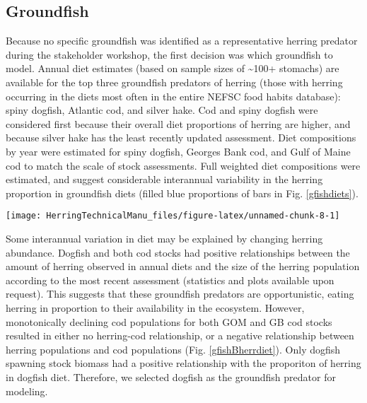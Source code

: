 \documentclass[]{article}
\let\origfigure\figure
\let\endorigfigure\endfigure
\renewenvironment{figure}[1][2] {
    \expandafter\origfigure\expandafter[H]
} {
    \endorigfigure
}
\begin{document}
\subsection{Groundfish}\label{groundfish}

Because no specific groundfish was identified as a representative
herring predator during the stakeholder workshop, the first decision was
which groundfish to model. Annual diet estimates (based on sample sizes
of \textasciitilde{}100+ stomachs) are available for the top three
groundfish predators of herring (those with herring occurring in the
diets most often in the entire NEFSC food habits database): spiny
dogfish, Atlantic cod, and silver hake. Cod and spiny dogfish were
considered first because their overall diet proportions of herring are
higher, and because silver hake has the least recently updated
assessment. Diet compositions by year were estimated for spiny dogfish,
Georges Bank cod, and Gulf of Maine cod to match the scale of stock
assessments. Full weighted diet compositions were estimated, and suggest
considerable interannual variability in the herring proportion in
groundfish diets (filled blue proportions of bars in Fig.
\ref{gfishdiets}).

\begin{figure}

{\centering \texttt{[image: HerringTechnicalManu\_files/figure-latex/unnamed-chunk-8-1]} 

}

\caption{Annual diet compositions for major groundfish predators of herring estimated from NEFSC food habits database \label{gfishdiets}}\label{fig:unnamed-chunk-8}
\end{figure}

Some interannual variation in diet may be explained by changing herring
abundance. Dogfish and both cod stocks had positive relationships
between the amount of herring observed in annual diets and the size of
the herring population according to the most recent assessment
(statistics and plots available upon request). This suggests that these
groundfish predators are opportunistic, eating herring in proportion to
their availability in the ecosystem. However, monotonically declining
cod populations for both GOM and GB cod stocks resulted in either no
herring-cod relationship, or a negative relationship between herring
populations and cod populations (Fig. \ref{gfishBherrdiet}). Only
dogfish spawning stock biomass had a positive relationship with the
proporiton of herring in dogfish diet. Therefore, we selected dogfish as
the groundfish predator for modeling.
\end{document}
